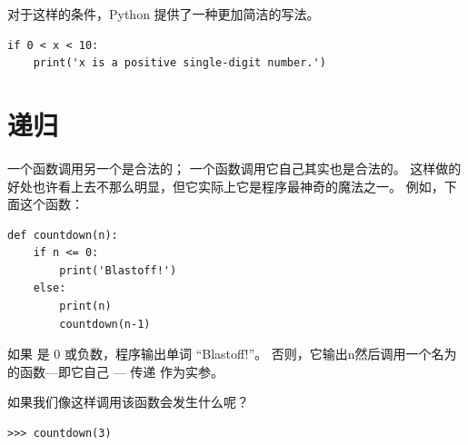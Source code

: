{{{{%

对于这样的条件，Python 提供了一种更加简洁的写法。

\begin{lstlisting}
if 0 < x < 10:
    print('x is a positive single-digit number.')
\end{lstlisting}


\section{递归}
\label{recursion}
  


一个函数调用另一个是合法的； 一个函数调用它自己其实也是合法的。
这样做的好处也许看上去不那么明显，但它实际上它是程序最神奇的魔法之一。
例如，下面这个函数：

\begin{lstlisting}
def countdown(n):
    if n <= 0:
        print('Blastoff!')
    else:
        print(n)
        countdown(n-1)
\end{lstlisting}

%

如果  是 0 或负数，程序输出单词 ``Blastoff!''。
否则，它输出n然后调用一个名为  的函数—即它自己 --- 传递  作为实参。


如果我们像这样调用该函数会发生什么呢？


\begin{lstlisting}
>>> countdown(3)
\end{lstlisting}

}}}}
